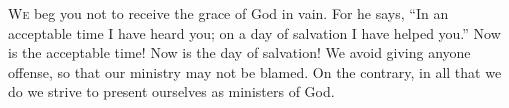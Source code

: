 \lettrine[lines=3,loversize=0.15]{W}{e} beg you not to receive the grace of God in vain. For he says, “In an acceptable time I have heard you; on a day of salvation I have helped you.” Now is the acceptable time! Now is the day of salvation! We avoid giving anyone offense, so that our ministry may not be blamed. On the contrary, in all that we do we strive to present ourselves as ministers of God.
